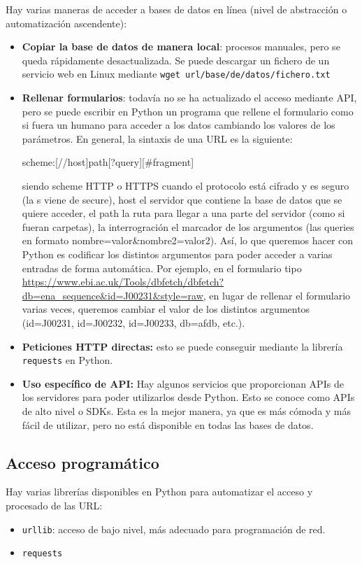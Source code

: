 Hay varias maneras de acceder a bases de datos en línea (nivel de abstracción o automatización ascendente):
\begin{itemize}
\item \textbf{Copiar la base de datos de manera local}: procesos manuales, pero se queda rápidamente desactualizada. Se puede descargar un fichero de un servicio web en Linux mediante \texttt{wget url/base/de/datos/fichero.txt}
\item \textbf{Rellenar formularios}: todavía no se ha actualizado el acceso mediante API, pero se puede escribir en Python un programa que rellene el formulario como si fuera un humano para acceder a los datos cambiando los valores de los parámetros. En general, la sintaxis de una URL es la siguiente:
\begin{center}
scheme:[//host]path[?query][\#fragment]\\
\end{center}
siendo scheme HTTP o HTTPS cuando el protocolo está cifrado y es seguro (la s viene de secure), host el servidor que contiene la base de datos que se quiere acceder, el path la ruta para llegar a una parte del servidor (como si fueran carpetas), la interrogración el marcador de los argumentos (las queries en formato nombre=valor\&nombre2=valor2). Así, lo que queremos hacer con Python es codificar los distintos argumentos para poder acceder a varias entradas de forma automática. Por ejemplo, en el formulario tipo \href{https://www.ebi.ac.uk/Tools/dbfetch/dbfetch?db=ena\_sequence\&id=J00231\&style=raw}{https://www.ebi.ac.uk/Tools/dbfetch/dbfetch?db=ena\_sequence\&id=J00231\&style=raw}, en lugar de rellenar el formulario varias veces, queremos cambiar el valor de los distintos argumentos (id=J00231, id=J00232, id=J00233, db=afdb, etc.). 
\item \textbf{Peticiones HTTP directas:} esto se puede conseguir mediante la librería \texttt{requests} en Python.
\item \textbf{Uso específico de API:} Hay algunos servicios que proporcionan APIs de los servidores para poder utilizarlos desde Python. Esto se conoce como APIs de alto nivel o SDKs. Esta es la mejor manera, ya que es más cómoda y más fácil de utilizar, pero no está disponible en todas las bases de datos.
\end{itemize} 

\subsection{Acceso programático}
Hay varias librerías disponibles en Python para automatizar el acceso y procesado de las URL:
\begin{itemize}
\item \texttt{urllib}: acceso de bajo nivel, más adecuado para programación de red.
\item \texttt{requests}
\end{itemize}

